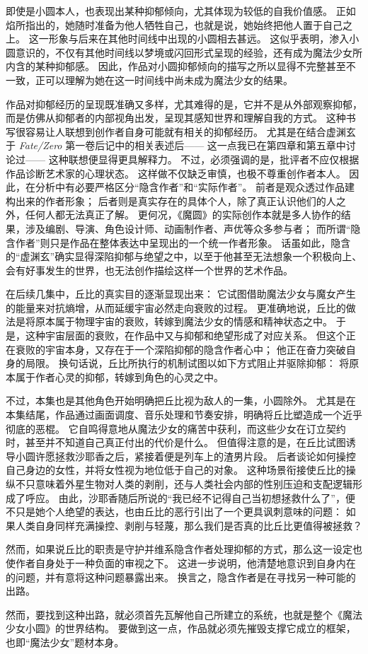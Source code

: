 即使是小圆本人，也表现出某种抑郁倾向，尤其体现为较低的自我价值感。
正如焰所指出的，她随时准备为他人牺牲自己，也就是说，她始终把他人置于自己之上。
这一形象与后来在其他时间线中出现的小圆相去甚远。
这似乎表明，渗入小圆意识的，不仅有其他时间线以梦境或闪回形式呈现的经验，还有成为魔法少女所内含的某种抑郁感。
因此，作品对小圆抑郁倾向的描写之所以显得不完整甚至不一致，正可以理解为她在这一时间线中尚未成为魔法少女的结果。

作品对抑郁经历的呈现既准确又多样，尤其难得的是，它并不是从外部观察抑郁，而是仿佛从抑郁者的内部视角出发，呈现其感知世界和理解自我的方式。
这种书写很容易让人联想到创作者自身可能就有相关的抑郁经历。
尤其是在结合虚渊玄于 \emph{Fate/Zero} 第一卷后记中的相关表述后——
这一点我已在第四章和第五章中讨论过——
这种联想便显得更具解释力。
不过，必须强调的是，批评者不应仅根据作品诊断艺术家的心理状态。
这样做不仅缺乏审慎，也极不尊重创作者本人。
因此，在分析中有必要严格区分“隐含作者”和“实际作者”。
前者是观众透过作品建构出来的作者形象；
后者则是真实存在的具体个人，除了真正认识他们的人之外，任何人都无法真正了解。
更何况，《魔圆》的实际创作本就是多人协作的结果，涉及编剧、导演、角色设计师、动画制作者、声优等众多参与者；
而所谓“隐含作者”则只是作品在整体表达中呈现出的一个统一作者形象。
话虽如此，隐含的“虚渊玄”确实显得深陷抑郁与绝望之中，以至于他甚至无法想象一个积极向上、会有好事发生的世界，也无法创作描绘这样一个世界的艺术作品。

在后续几集中，丘比的真实目的逐渐显现出来：
它试图借助魔法少女与魔女产生的能量来对抗熵增，从而延缓宇宙必然走向衰败的过程。
更准确地说，丘比的做法是将原本属于物理宇宙的衰败，转嫁到魔法少女的情感和精神状态之中。
于是，这种宇宙层面的衰败，在作品中又与抑郁和绝望形成了对应关系。
但这个正在衰败的宇宙本身，又存在于一个深陷抑郁的隐含作者心中；
他正在奋力突破自身的局限。
换句话说，丘比所执行的机制试图以如下方式阻止并驱除抑郁：
将原本属于作者心灵的抑郁，转嫁到角色的心灵之中。

不过，本集也是其他角色开始明确把丘比视为敌人的一集，小圆除外。
尤其是在本集结尾，作品通过画面调度、音乐处理和节奏安排，明确将丘比塑造成一个近乎彻底的恶棍。
它自鸣得意地从魔法少女的痛苦中获利，而这些少女在订立契约时，甚至并不知道自己真正付出的代价是什么。
但值得注意的是，在丘比试图诱导小圆许愿拯救沙耶香之后，紧接着便是列车上的渣男片段。
后者谈论如何操控自己身边的女性，并将女性视为地位低于自己的对象。
这种场景衔接使丘比的操纵不只意味着外星生物对人类的剥削，还与人类社会内部的性别压迫和支配逻辑形成了呼应。
由此，沙耶香随后所说的“我已经不记得自己当初想拯救什么了”，便不只是她个人绝望的表达，也由丘比的恶行引出了一个更具讽刺意味的问题：
如果人类自身同样充满操控、剥削与轻蔑，那么我们是否真的比丘比更值得被拯救？

然而，如果说丘比的职责是守护并维系隐含作者处理抑郁的方式，那么这一设定也使作者自身处于一种负面的审视之下。
这进一步说明，他清楚地意识到自身内在的问题，并有意将这种问题暴露出来。
换言之，隐含作者是在寻找另一种可能的出路。

然而，要找到这种出路，就必须首先瓦解他自己所建立的系统，也就是整个《魔法少女小圆》的世界结构。
要做到这一点，作品就必须先摧毁支撑它成立的框架，也即“魔法少女”题材本身。
